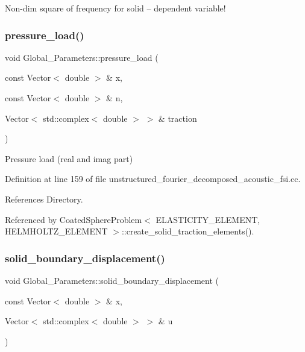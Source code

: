 Non-\/dim square of frequency for solid -- dependent variable! 

\mbox{\label{namespaceGlobal__Parameters_a0ddb3a77481b907fbb34f2e8d0a6eb9f}} 
\subsubsection{\texorpdfstring{pressure\+\_\+load()}{pressure\_load()}}
{\footnotesize\ttfamily void Global\+\_\+\+Parameters\+::pressure\+\_\+load (\begin{DoxyParamCaption}\item[{const Vector$<$ double $>$ \&}]{x,  }\item[{const Vector$<$ double $>$ \&}]{n,  }\item[{Vector$<$ std\+::complex$<$ double $>$ $>$ \&}]{traction }\end{DoxyParamCaption})}



Pressure load (real and imag part) 



Definition at line 159 of file unstructured\+\_\+fourier\+\_\+decomposed\+\_\+acoustic\+\_\+fsi.\+cc.



References Directory.



Referenced by Coated\+Sphere\+Problem$<$ E\+L\+A\+S\+T\+I\+C\+I\+T\+Y\+\_\+\+E\+L\+E\+M\+E\+N\+T, H\+E\+L\+M\+H\+O\+L\+T\+Z\+\_\+\+E\+L\+E\+M\+E\+N\+T $>$\+::create\+\_\+solid\+\_\+traction\+\_\+elements().

\mbox{\label{namespaceGlobal__Parameters_ab51fa55d06d9963d363bcf966cfcc62b}} 
\subsubsection{\texorpdfstring{solid\+\_\+boundary\+\_\+displacement()}{solid\_boundary\_displacement()}}
{\footnotesize\ttfamily void Global\+\_\+\+Parameters\+::solid\+\_\+boundary\+\_\+displacement (\begin{DoxyParamCaption}\item[{const Vector$<$ double $>$ \&}]{x,  }\item[{Vector$<$ std\+::complex$<$ double $>$ $>$ \&}]{u }\end{DoxyParamCaption})}



